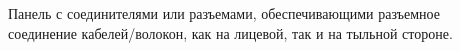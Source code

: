 Панель с соединителями или разъемами, обеспечивающими
разъемное соединение кабелей/волокон, как на лицевой,
так и на тыльной стороне.